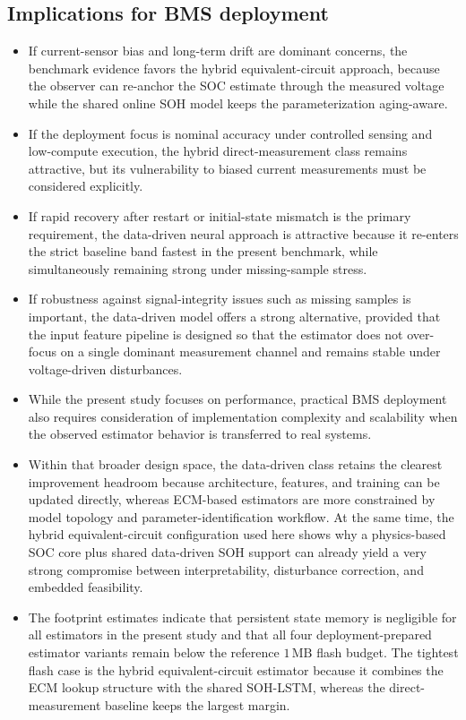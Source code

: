 \documentclass[review,nopreprintline]{elsarticle}
\begin{document}
\subsection{Implications for BMS deployment}
\begin{itemize}[leftmargin=*]
    \item If current-sensor bias and long-term drift are dominant concerns, the benchmark evidence favors the hybrid equivalent-circuit approach, because the observer can re-anchor the SOC estimate through the measured voltage while the shared online SOH model keeps the parameterization aging-aware.
    \item If the deployment focus is nominal accuracy under controlled sensing and low-compute execution, the hybrid direct-measurement class remains attractive, but its vulnerability to biased current measurements must be considered explicitly.
    \item If rapid recovery after restart or initial-state mismatch is the primary requirement, the data-driven neural approach is attractive because it re-enters the strict baseline band fastest in the present benchmark, while simultaneously remaining strong under missing-sample stress.
    \item If robustness against signal-integrity issues such as missing samples is important, the data-driven model offers a strong alternative, provided that the input feature pipeline is designed so that the estimator does not over-focus on a single dominant measurement channel and remains stable under voltage-driven disturbances.
    \item While the present study focuses on performance, practical BMS deployment also requires consideration of implementation complexity and scalability when the observed estimator behavior is transferred to real systems.
    \item Within that broader design space, the data-driven class retains the clearest improvement headroom because architecture, features, and training can be updated directly, whereas ECM-based estimators are more constrained by model topology and parameter-identification workflow. At the same time, the hybrid equivalent-circuit configuration used here shows why a physics-based SOC core plus shared data-driven SOH support can already yield a very strong compromise between interpretability, disturbance correction, and embedded feasibility.
    \item The footprint estimates indicate that persistent state memory is negligible for all estimators in the present study and that all four deployment-prepared estimator variants remain below the reference $1\,\mathrm{MB}$ flash budget. The tightest flash case is the hybrid equivalent-circuit estimator because it combines the ECM lookup structure with the shared SOH-LSTM, whereas the direct-measurement baseline keeps the largest margin.

\end{itemize}
\end{document}
